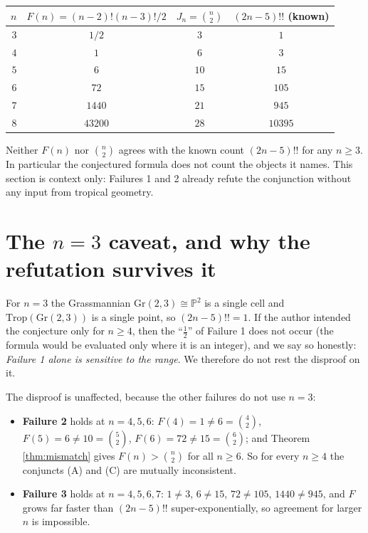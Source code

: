 \documentclass[11pt]{article}
\theoremstyle{definition}
\theoremstyle{remark}
\begin{document}
\begin{center}
\begin{tabular}{r|c|c|c}
$n$ & $F(n) = (n-2)!(n-3)!/2$ & $J_n = \binom{n}{2}$ & $(2n-5)!!$ (known) \\
\hline
$3$ & $1/2$    & $3$  & $1$ \\
$4$ & $1$      & $6$  & $3$ \\
$5$ & $6$      & $10$ & $15$ \\
$6$ & $72$     & $15$ & $105$ \\
$7$ & $1440$   & $21$ & $945$ \\
$8$ & $43200$  & $28$ & $10395$ \\
\end{tabular}
\end{center}

Neither $F(n)$ nor $\binom{n}{2}$ agrees with the known count $(2n-5)!!$ for any
$n \ge 3$. In particular the conjectured formula does not count the objects it names.
This section is context only: Failures 1 and 2 already refute the conjunction
without any input from tropical geometry.

\section{The $n=3$ caveat, and why the refutation survives it}

For $n = 3$ the Grassmannian $\mathrm{Gr}(2,3) \cong \mathbb{P}^2$ is a single cell
and $\mathrm{Trop}(\mathrm{Gr}(2,3))$ is a single point, so $(2n-5)!! = 1$. If the
author intended the conjecture only for $n \ge 4$, then the ``$\tfrac12$'' of
Failure 1 does not occur (the formula would be evaluated only where it is an
integer), and we say so honestly: \emph{Failure 1 alone is sensitive to the range}. 
We therefore do not rest the disproof on it.

The disproof is unaffected, because the other failures do not use $n = 3$:

\begin{itemize}
\item \textbf{Failure 2} holds at $n = 4, 5, 6$: $F(4) = 1 \neq 6 = \binom42$,
$F(5) = 6 \neq 10 = \binom52$, $F(6) = 72 \neq 15 = \binom62$; and Theorem
\ref{thm:mismatch} gives $F(n) > \binom{n}{2}$ for all $n \ge 6$. So for every
$n \ge 4$ the conjuncts (A) and (C) are mutually inconsistent.
\item \textbf{Failure 3} holds at $n = 4, 5, 6, 7$: $1 \neq 3$, $6 \neq 15$,
$72 \neq 105$, $1440 \neq 945$, and $F$ grows far faster than $(2n-5)!!$
super-exponentially, so agreement for larger $n$ is impossible.
\end{itemize}
\end{document}
